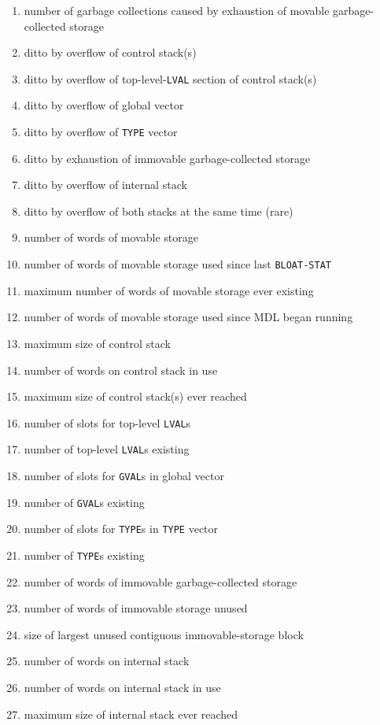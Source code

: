 \documentclass[a4paper]{scrbook}
\begin{document}
\begin{enumerate}
\def\labelenumi{\arabic{enumi}.}
\item
  number of garbage collections caused by exhaustion of movable garbage-collected storage
\item
  ditto by overflow of control stack(s)
\item
  ditto by overflow of top-level-\texttt{LVAL} section of control stack(s)
\item
  ditto by overflow of global vector
\item
  ditto by overflow of \texttt{TYPE} vector
\item
  ditto by exhaustion of immovable garbage-collected storage
\item
  ditto by overflow of internal stack
\item
  ditto by overflow of both stacks at the same time (rare)
\item
  number of words of movable storage
\item
  number of words of movable storage used since last \texttt{BLOAT-STAT}
\item
  maximum number of words of movable storage ever existing
\item
  number of words of movable storage used since MDL began running
\item
  maximum size of control stack
\item
  number of words on control stack in use
\item
  maximum size of control stack(s) ever reached
\item
  number of slots for top-level \texttt{LVAL}s
\item
  number of top-level \texttt{LVAL}s existing
\item
  number of slots for \texttt{GVAL}s in global vector
\item
  number of \texttt{GVAL}s existing
\item
  number of slots for \texttt{TYPE}s in \texttt{TYPE} vector
\item
  number of \texttt{TYPE}s existing
\item
  number of words of immovable garbage-collected storage
\item
  number of words of immovable storage unused
\item
  size of largest unused contiguous immovable-storage block
\item
  number of words on internal stack
\item
  number of words on internal stack in use
\item
  maximum size of internal stack ever reached
\end{enumerate}
\end{document}
